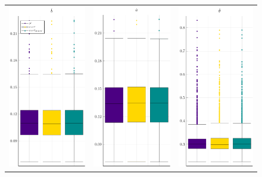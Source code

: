 \begin{figure}[h]
	\centering
	\begin{tabular}[b]{c c c}
		\includegraphics[height=270px,width=.30\textwidth]{Figures/1a/RMSE_b.pdf} & \includegraphics[height=270px,width=.30\textwidth]{Figures/1a/RMSE_a.pdf} & \includegraphics[height=270px,width=.30\textwidth]{Figures/1a/RMSE_t.pdf}
	\end{tabular}
\end{figure}
